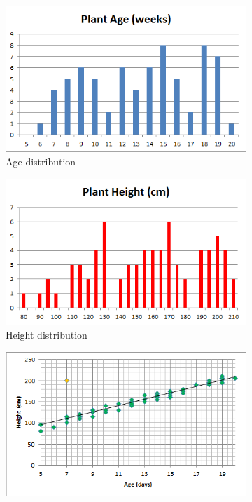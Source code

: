 \begin{figure}[t]
       \centering
        \begin{subfigure}[b]{0.30\textwidth}
                \centering
                \includegraphics[width=\textwidth]{images/DP/plant_age}
                \caption{\small Age distribution}\label{fig:planta}
        \end{subfigure}
        \begin{subfigure}[b]{0.30\textwidth}
                \centering
                \includegraphics[width=\textwidth]{images/DP/plant_height}
                \caption{\small Height distribution}\label{fig:plantb} 
        \end{subfigure}
        \begin{subfigure}[b]{0.30\textwidth}
                \centering
                \includegraphics[width=\textwidth]{images/DP/plant_height_vs_age}

\end{subfigure}
\end{figure}
